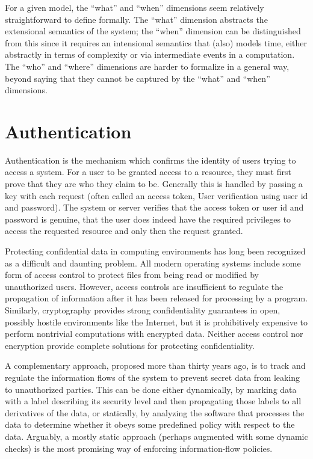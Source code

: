 For a given model, the \enquote{what} and \enquote{when} dimensions seem relatively straightforward to define formally. The \enquote{what} dimension abstracts the extensional semantics
of the system; the \enquote{when} dimension can be distinguished from this since it requires an intensional semantics that (also) models time, either abstractly in terms of complexity
or via intermediate events in a computation. The \enquote{who} and \enquote{where} dimensions are
harder to formalize in a general way, beyond saying that they cannot be captured by the
\enquote{what} and \enquote{when} dimensions.

\section{Authentication}
Authentication is the mechanism which confirms the identity of users trying to access a system. For a user to be granted access to a resource, they must first prove that they are who they claim to be. Generally this is handled by passing a key with each request (often called an access token, User verification using user id and password). The system or server verifies that the access token or user id and password is genuine, that the user does indeed have the required privileges to access the requested resource and only then the request granted.

Protecting confidential data in computing environments has long been recognized as a difficult and daunting problem. All modern operating systems include some form of access control to protect files from being read or modified by unauthorized users. However, access controls are insufficient to regulate the propagation of information after it has been released for processing by a program. Similarly,
cryptography provides strong confidentiality guarantees in open, possibly hostile environments like the Internet, but it is prohibitively expensive to perform nontrivial computations with encrypted data. Neither access control nor encryption
provide complete solutions for protecting confidentiality.

A complementary approach, proposed more than thirty years ago, is to track and regulate the information flows of the system to prevent secret data from leaking to unauthorized parties. This can be done either dynamically, by marking data with a label describing its security level and then propagating those labels to all derivatives of the data, or statically, by analyzing the software that processes
the data to determine whether it obeys some predefined policy with respect to the data. Arguably, a mostly static approach (perhaps augmented with some dynamic checks) is the most promising way of enforcing information-flow policies.


